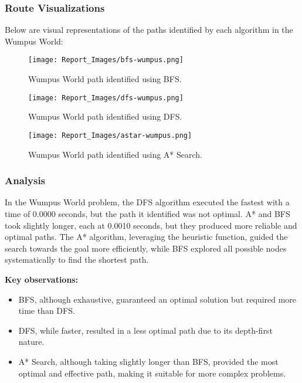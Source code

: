 \documentclass[12pt]{article}
\begin{document}
\subsubsection{Route Visualizations}
Below are visual representations of the paths identified by each algorithm in the Wumpus World:

\begin{figure}[h!]
    \centering
    \texttt{[image: Report\_Images/bfs-wumpus.png]}
    \caption{Wumpus World path identified using BFS.}
    \label{fig:BFS_wumpus}
\end{figure}

\begin{figure}[h!]
    \centering
    \texttt{[image: Report\_Images/dfs-wumpus.png]}
    \caption{Wumpus World path identified using DFS.}
    \label{fig:DFS_wumpus}
\end{figure}

\begin{figure}[h!]
    \centering
    \texttt{[image: Report\_Images/astar-wumpus.png]}
    \caption{Wumpus World path identified using A* Search.}
    \label{fig:Astar_wumpus}
\end{figure}

\subsubsection{Analysis}
In the Wumpus World problem, the DFS algorithm executed the fastest with a time of 0.0000 seconds, but the path it identified was not optimal. A* and BFS took slightly longer, each at 0.0010 seconds, but they produced more reliable and optimal paths. The A* algorithm, leveraging the heuristic function, guided the search towards the goal more efficiently, while BFS explored all possible nodes systematically to find the shortest path.

\textbf{Key observations:}
\begin{itemize}
    \item BFS, although exhaustive, guaranteed an optimal solution but required more time than DFS.
    \item DFS, while faster, resulted in a less optimal path due to its depth-first nature.
    \item A* Search, although taking slightly longer than BFS, provided the most optimal and effective path, making it suitable for more complex problems.
\end{itemize}
\end{document}
